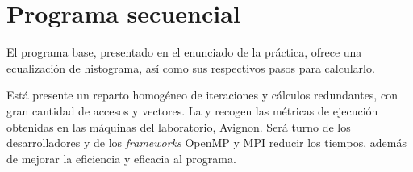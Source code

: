 \section{Programa secuencial}
El programa base, presentado en el enunciado de la práctica, ofrece una ecualización de histograma, así como sus respectivos pasos para calcularlo.

Está presente un reparto homogéneo de iteraciones y cálculos redundantes, con gran cantidad de accesos y vectores. La  y  recogen las métricas de ejecución obtenidas en las máquinas del laboratorio, Avignon.
Será turno de los desarrolladores y de los \textit{frameworks} OpenMP y MPI reducir los tiempos, además de mejorar la eficiencia y eficacia al programa.

